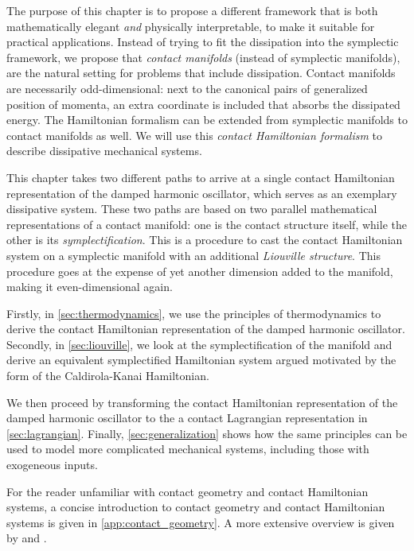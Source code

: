 The purpose of this chapter is to propose a different framework that is both mathematically elegant \emph{and} physically interpretable, to make it suitable for practical applications. Instead of trying to fit the dissipation into the symplectic framework, we propose that \emph{contact manifolds} (instead of symplectic manifolds), are the natural setting for problems that include dissipation. Contact manifolds are necessarily odd-dimensional: next to the canonical pairs of generalized position of momenta, an extra coordinate is included that absorbs the dissipated energy. The Hamiltonian formalism can be extended from symplectic manifolds to contact manifolds as well. We will use this \emph{contact Hamiltonian formalism} to describe dissipative mechanical systems.

This chapter takes two different paths to arrive at a single contact Hamiltonian representation of the damped harmonic oscillator, which serves as an exemplary dissipative system. These two paths are based on two parallel mathematical representations of a contact manifold: one is the contact structure itself, while the other is its \emph{symplectification}. This is a procedure to cast the contact Hamiltonian system on a symplectic manifold with an additional \emph{Liouville structure}. This procedure goes at the expense of yet another dimension added to the manifold, making it even-dimensional again.

Firstly, in \cref{sec:thermodynamics}, we use the principles of thermodynamics to derive the contact Hamiltonian representation of the damped harmonic oscillator. Secondly, in \cref{sec:liouville}, we look at the symplectification of the manifold and derive an equivalent symplectified Hamiltonian system argued motivated by the form of the Caldirola-Kanai Hamiltonian.

We then proceed by transforming the contact Hamiltonian representation of the damped harmonic oscillator to the a contact Lagrangian representation in \cref{sec:lagrangian}. Finally, \cref{sec:generalization} shows how the same principles can be used to model more complicated mechanical systems, including those with exogeneous inputs.

For the reader unfamiliar with contact geometry and contact Hamiltonian systems, a concise introduction to contact geometry and contact Hamiltonian systems is given in \cref{app:contact_geometry}. A more extensive overview is given by \citet{Geiges2008} and \citet{Libermann1987}.






